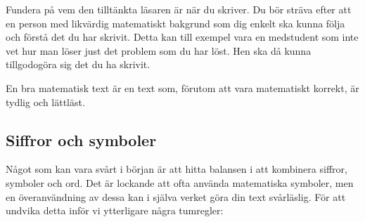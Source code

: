 \documentclass[titlepage]{article}
\begin{document}
Fundera på vem den tilltänkta läsaren är när du skriver. Du bör sträva efter att en person med likvärdig matematiskt bakgrund som dig enkelt ska kunna följa och förstå det du har skrivit. Detta kan till exempel vara en medstudent som inte vet hur man löser just det problem som du har löst. Hen ska då kunna tillgodogöra sig det du ha skrivit.

En bra matematisk text är en text som, förutom att vara matematiskt korrekt, är tydlig och lättläst.




\subsection{Siffror och symboler}

Något som kan vara svårt i början är att hitta balansen i att kombinera siffror, symboler och ord. Det är lockande att ofta använda matematiska symboler, men en överanvändning av dessa kan i själva verket göra din text svårläslig. För att undvika detta inför vi ytterligare några tumregler:
\end{document}
